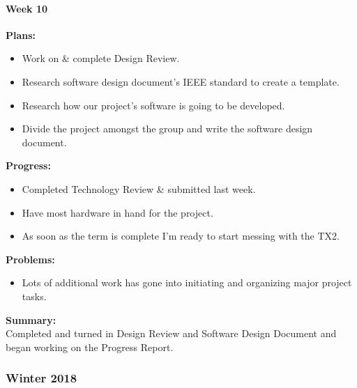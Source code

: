 \paragraph{Week 10}
\begin{adjustwidth}{2.5em}{0pt}
    \vspace{-0.5cm}\textbf{Plans:}
    \vspace{-0.5cm}
    \begin{itemize}
        \item Work on \& complete Design Review.
		\item Research software design document's IEEE standard to create a template.
		\item Research how our project's software is going to be developed. 
		\item Divide the project amongst the group and write the software design document. 
    \end{itemize} 
    \vspace{-0.3cm}\textbf{Progress:}
    \vspace{-0.5cm}
    \begin{itemize}
        \item Completed Technology Review \& submitted last week. 
		\item Have most hardware in hand for the project. 
		\item As soon as the term is complete I'm ready to start messing with the TX2.
    \end{itemize} 
    \vspace{-0.3cm}\textbf{Problems:}
    \vspace{-0.5cm}
    \begin{itemize}
        \item Lots of additional work has gone into initiating and organizing major project tasks.
    \end{itemize}
    \vspace{-0.3cm}\noindent\textbf{Summary:}\\
    \noindent Completed and turned in Design Review and Software Design Document and began working on the Progress Report. 
\end{adjustwidth} 

\subsubsection{Winter 2018}

